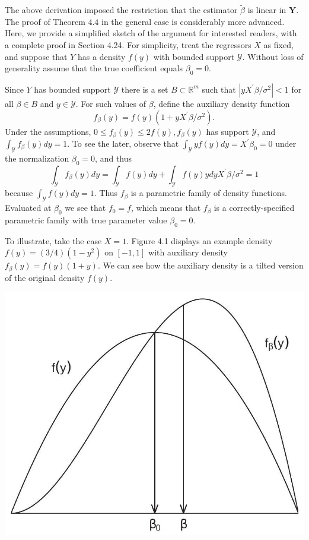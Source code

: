 \documentclass[10pt]{article}
\begin{document}
The above derivation imposed the restriction that the estimator $\widetilde{\beta}$ is linear in $\boldsymbol{Y}$. The proof of Theorem $4.4$ in the general case is considerably more advanced. Here, we provide a simplified sketch of the argument for interested readers, with a complete proof in Section 4.24. For simplicity, treat the regressors $X$ as fixed, and suppose that $Y$ has a density $f(y)$ with bounded support $\mathscr{Y}$. Without loss of generality assume that the true coefficient equals $\beta_{0}=0$.

Since $Y$ has bounded support $\mathscr{Y}$ there is a set $B \subset \mathbb{R}^{m}$ such that $\left|y X^{\prime} \beta / \sigma^{2}\right|<1$ for all $\beta \in B$ and $y \in \mathscr{Y}$. For such values of $\beta$, define the auxiliary density function
$$
f_{\beta}(y)=f(y)\left(1+y X^{\prime} \beta / \sigma^{2}\right) .
$$
Under the assumptions, $0 \leq f_{\beta}(y) \leq 2 f(y), f_{\beta}(y)$ has support $\mathscr{Y}$, and $\int_{\mathscr{Y}} f_{\beta}(y) d y=1$. To see the later, observe that $\int_{\mathscr{Y}} y f(y) d y=X^{\prime} \beta_{0}=0$ under the normalization $\beta_{0}=0$, and thus
$$
\int_{\mathscr{Y}} f_{\beta}(y) d y=\int_{\mathscr{Y}} f(y) d y+\int_{\mathscr{Y}} f(y) y d y X^{\prime} \beta / \sigma^{2}=1
$$
because $\int_{\mathscr{Y}} f(y) d y=1$. Thus $f_{\beta}$ is a parametric family of density functions. Evaluated at $\beta_{0}$ we see that $f_{0}=f$, which means that $f_{\beta}$ is a correctly-specified parametric family with true parameter value $\beta_{0}=0$.

To illustrate, take the case $X=1$. Figure 4.1 displays an example density $f(y)=(3 / 4)\left(1-y^{2}\right)$ on $[-1,1]$ with auxiliary density $f_{\beta}(y)=f(y)(1+y)$. We can see how the auxiliary density is a tilted version of the original density $f(y)$.

\includegraphics[max width=\textwidth]{2022_09_17_46fafb30295495354ae2g-09}
\end{document}
